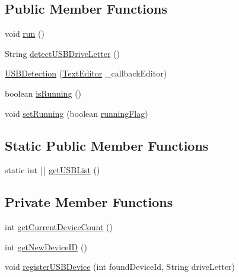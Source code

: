 \subsection*{Public Member Functions}
\begin{DoxyCompactItemize}
\item 
void \mbox{\hyperlink{classlogic_1_1_u_s_b_detection_afa5927f03e8a15d8797c7448b2b56015}{run}} ()
\item 
String \mbox{\hyperlink{classlogic_1_1_u_s_b_detection_a1d7dc58db8f4fd4de5ba1387dc0de92b}{detect\+U\+S\+B\+Drive\+Letter}} ()
\item 
\mbox{\hyperlink{classlogic_1_1_u_s_b_detection_a4b63c640806fa72a6278f62ae446da76}{U\+S\+B\+Detection}} (\mbox{\hyperlink{classlogic_1_1_text_editor}{Text\+Editor}} \+\_\+callback\+Editor)
\item 
boolean \mbox{\hyperlink{classlogic_1_1_u_s_b_detection_af59497baf1a3b965b948103da0098fd5}{is\+Running}} ()
\item 
void \mbox{\hyperlink{classlogic_1_1_u_s_b_detection_aa9406feb1bb47a2ea840f352b960bfb8}{set\+Running}} (boolean \mbox{\hyperlink{classlogic_1_1_u_s_b_detection_a9f2381b5bc0bb9c9fee03d4efcfa03cb}{running\+Flag}})
\end{DoxyCompactItemize}
\subsection*{Static Public Member Functions}
\begin{DoxyCompactItemize}
\item 
static int \mbox{[}$\,$\mbox{]} \mbox{\hyperlink{classlogic_1_1_u_s_b_detection_aa344d4736cf7b1d95e5f3ff36d70de28}{get\+U\+S\+B\+List}} ()
\end{DoxyCompactItemize}
\subsection*{Private Member Functions}
\begin{DoxyCompactItemize}
\item 
int \mbox{\hyperlink{classlogic_1_1_u_s_b_detection_a684dad305f6e4adf0362e33bbb25d041}{get\+Current\+Device\+Count}} ()
\item 
int \mbox{\hyperlink{classlogic_1_1_u_s_b_detection_a33eefbd24dcb95bf013fa91b0402c157}{get\+New\+Device\+ID}} ()
\item 
void \mbox{\hyperlink{classlogic_1_1_u_s_b_detection_adfbfb167a4d6cc1a5cb186c0246b131a}{register\+U\+S\+B\+Device}} (int found\+Device\+Id, String drive\+Letter)
\end{DoxyCompactItemize}

